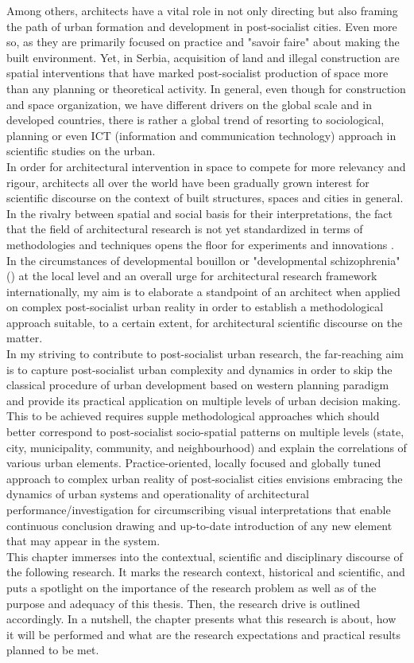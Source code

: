 \documentclass[11pt]{report}
\begin{document}
Among others, architects have a vital role in not only directing but also framing the path of urban formation and development in post-socialist cities. Even more so, as they are primarily focused on practice and "savoir faire" about making the built environment. Yet, in Serbia, acquisition of land and illegal construction are spatial interventions that have marked post-socialist production of space more than any planning or theoretical activity. In general, even though for construction and space organization, we have different drivers on the global scale and in developed countries, there is rather a global trend of resorting to sociological, planning or even ICT (information and communication technology) approach in scientific studies on the urban. 
\\
In order for architectural intervention in space to compete for more relevancy and rigour,  architects all over the world have been gradually grown interest for scientific discourse on the context of built structures, spaces and cities in general.  In the rivalry between spatial and social basis for their interpretations, the fact that the field of architectural research is not yet standardized in terms of methodologies and techniques opens the floor for experiments and innovations \href{ref}{\citealt{ref}}. In the circumstances of developmental bouillon or "developmental schizophrenia"(\href{Vujosevic}{\citealt{Vujosevic}}) at the local level and an overall urge for architectural research framework internationally, my aim is to elaborate a standpoint of an architect when applied on complex post-socialist urban reality in order to establish a methodological approach suitable, to a certain extent, for architectural scientific discourse on the matter.
\\
In my striving to contribute to post-socialist urban research, the far-reaching aim is to capture post-socialist urban complexity and dynamics in order to skip the classical procedure of urban development based on western planning paradigm and provide its practical application on multiple levels of urban decision making. This to be achieved requires supple methodological approaches which should better correspond to post-socialist socio-spatial patterns on multiple levels (state, city, municipality, community, and neighbourhood) and explain the correlations of various urban elements. Practice-oriented, locally focused and globally tuned approach to complex urban reality of post-socialist cities envisions embracing the dynamics of urban systems and operationality of architectural performance/investigation for circumscribing visual interpretations that enable continuous conclusion drawing and up-to-date introduction of any new element that may appear in the system.
\\
This chapter immerses into the contextual, scientific and disciplinary discourse of the following research. It marks the research context, historical and scientific, and puts a spotlight on the importance of the research problem as well as of the purpose and adequacy of this thesis. Then, the research drive is outlined accordingly. In a nutshell, the chapter presents what this research is about, how it will be performed and what are the research expectations and practical results planned to be met. 
\end{document}
